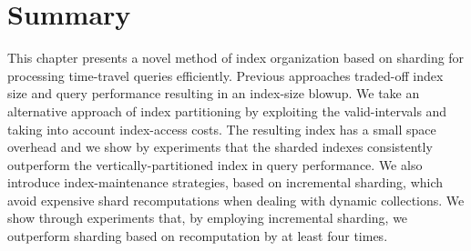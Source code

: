 \section{Summary}
\label{chap:sharding:sec:summary}

This chapter presents a novel method of index organization based on
sharding for processing time-travel queries efficiently. Previous approaches traded-off index size and query performance resulting in an index-size blowup. We take an alternative approach of index partitioning by exploiting the valid-intervals and taking into account index-access costs. The resulting index has a small space overhead and we show by experiments that the sharded indexes consistently outperform the vertically-partitioned index in query performance. We also introduce index-maintenance strategies, based on incremental sharding, which avoid expensive shard recomputations when dealing with dynamic collections. We show through experiments that, by employing incremental sharding, we outperform sharding based on recomputation by  at least four times. 
